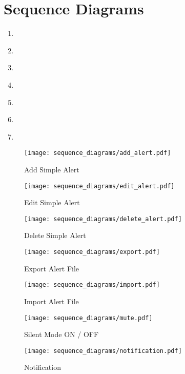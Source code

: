 \chapter{Sequence Diagrams}\label{ch:sequence_diagrams}

\begin{enumerate}
    \item~
    \item~
    \item~
    \item~
    \item~
    \item~
    \item~
\end{enumerate}

\begin{figure}[]
	\centering
    \caption{Add Simple Alert}\label{fig:add_simple_alert}
    \texttt{[image: sequence\_diagrams/add\_alert.pdf]}
\end{figure}

\begin{figure}[]
	\centering
    \caption{Edit Simple Alert}\label{fig:edit_simple_alert}
    \texttt{[image: sequence\_diagrams/edit\_alert.pdf]}
\end{figure}

\begin{figure}[]
	\centering
    \caption{Delete Simple Alert}\label{fig:delete_simple_alert}
    \texttt{[image: sequence\_diagrams/delete\_alert.pdf]}
\end{figure}

\begin{figure}[]
	\centering
    \caption{Export Alert File}\label{fig:export_alert_file}
    \texttt{[image: sequence\_diagrams/export.pdf]}
\end{figure}

\begin{figure}[]
	\centering
    \caption{Import Alert File}\label{fig:import_alert_file}
    \texttt{[image: sequence\_diagrams/import.pdf]}
\end{figure}

\begin{figure}[]
	\centering
    \caption{Silent Mode ON / OFF}\label{fig:silent_mode}
	\texttt{[image: sequence\_diagrams/mute.pdf]}
\end{figure}

\begin{figure}[]
	\centering
    \caption{Notification}\label{fig:notification}
	\texttt{[image: sequence\_diagrams/notification.pdf]}
\end{figure}
